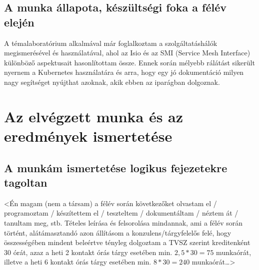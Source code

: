 \documentclass[a4paper,oneside]{article}
\begin{document}


\subsection{A munka állapota, készültségi foka a félév elején}
\label{sec:munka-allap-kesz}
A témalaboratórium alkalmával már foglalkoztam a szolgáltatáshálók 
megismerésével és használatával, ahol az Isio és az SMI (Service Mesh 
Interface) különböző aspektusait hasonlítottam össze. Ennek során 
mélyebb rálátást sikerült nyernem a Kubernetes használatára és arra, 
hogy egy jó dokumentáció milyen nagy segítséget nyújthat azoknak, 
akik ebben az iparágban dolgoznak. 

\newpage
\section{Az elvégzett munka és az eredmények ismertetése}
\label{sec:az-elvegzett-munka}


\subsection{A munkám ismertetése logikus fejezetekre tagoltan}
\label{sec:a-munkam-ismert}
<Én magam (nem a társam) a félév során következőket olvastam el /
programoztam / készítettem el / teszteltem / dokumentáltam / néztem át
/ tanultam meg, stb.  Tételes leírása és felsorolása mindannak, ami a
félév során történt, alátámasztandó azon állításom a
konzulens/tárgyfelelős felé, hogy összességében mindent beleértve
tényleg dolgoztam a TVSZ szerint kreditenként 30 órát, azaz a heti 2
kontakt órás tárgy esetében min. $2,5*30 = 75$ munkaórát, illetve a
heti 6 kontakt órás tárgy esetében min. $8*30 = 240$ munkaórát\dots>
\end{document}
